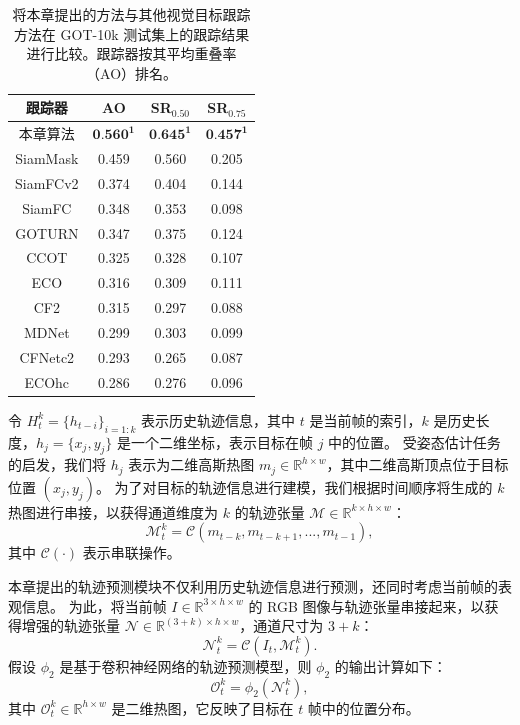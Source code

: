 \begin{table}[t]
\centering
\caption{将本章提出的方法与其他视觉目标跟踪方法在 GOT-10k 测试集上的跟踪结果进行比较。跟踪器按其平均重叠率（AO）排名。}
\begin{tabular}{cccc}
\bottomrule
跟踪器   &  AO   &  SR$_{0.50}$ & SR$_{0.75}$  \\
\hline
本章算法 &  $\textbf{0.560}^\textbf{1}$ & $\textbf{0.645}^\textbf{1}$  & $\textbf{0.457}^\textbf{1}$  \\
SiamMask \cite{Wang2018SiamMask}  &  0.459&  0.560 &0.205 \\
SiamFCv2 \cite{valmadre2017end} &  0.374&  0.404 &0.144 \\
SiamFC \cite{SiamFC} &  0.348&  0.353 &0.098 \\
GOTURN	\cite{GOTURN} &  0.347&  0.375 &0.124 \\
CCOT	 \cite{danelljan2016beyond} &  0.325&  0.328 &0.107 \\
ECO \cite{danelljan2017eco} &  0.316&  0.309 &0.111 \\
CF2	\cite{CF2} &  0.315&  0.297 &0.088 \\
MDNet \cite{MDNet} &  0.299&  0.303 &0.099 \\
CFNetc2 \cite{valmadre2017end} &  0.293&  0.265 &0.087 \\
ECOhc \cite{danelljan2017eco} &  0.286&  0.276 &0.096 \\
\bottomrule
\end{tabular}
\label{table:got}
\end{table}

令 $H_{t}^{k} = \{h_{t-i}\}_{i=1:k}$ 表示历史轨迹信息，其中 $t$ 是当前帧的索引，$k$ 是历史长度，$h_{j} = \{x_{j}, y_{j}\}$ 是一个二维坐标，表示目标在帧 $j$ 中的位置。
受姿态估计任务的启发，我们将 $h_{j}$ 表示为二维高斯热图 $m_{j} \in \mathbb R^{h \times w}$，其中二维高斯顶点位于目标位置 $(x_{j}, y_{j})$。
为了对目标的轨迹信息进行建模，我们根据时间顺序将生成的 $k$ 热图进行串接，以获得通道维度为 $k$ 的轨迹张量 $\mathcal{M} \in \mathbb{R}^{k \times h \times w}$：
\begin{equation}
    \mathcal{M}_{t}^{k} = \mathcal{C}(m_{t-k}, m_{t-k+1}, ..., m_{t-1}),
\end{equation}
其中 $\mathcal{C}(\cdot)$ 表示串联操作。

本章提出的轨迹预测模块不仅利用历史轨迹信息进行预测，还同时考虑当前帧的表观信息。
为此，将当前帧 $I \in \mathbb{R}^{3 \times h \times w}$ 的 RGB 图像与轨迹张量串接起来，以获得增强的轨迹张量 $\mathcal{N} \in \mathbb{R}^{(3+k) \times h \times w}$，通道尺寸为 $3+k$：
\begin{equation}
    \mathcal{N}_{t}^{k} = \mathcal{C}(I_{t}, \mathcal{M}_{t}^{k}).
\end{equation}
假设 $\phi_{2}$ 是基于卷积神经网络的轨迹预测模型，则 $\phi_{2}$ 的输出计算如下：
\begin{equation}
    \mathcal{O}_{t}^{k} = \phi_{2}(\mathcal{N}_{t}^{k}),
\end{equation}
其中 $\mathcal{O}_{t}^{k} \in \mathbb{R}^{h \times w}$ 是二维热图，它反映了目标在 $t$ 帧中的位置分布。


